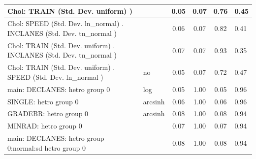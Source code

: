\begin{table}
\begin{center}
\begin{tabular}{|l|l|c|c|c|l|}
			\hline
			 Chol: TRAIN (Std. Dev. uniform) ) &  & 0.05 & 0.07 & 0.76 & 0.45 \\
			\hline
			 Chol: SPEED (Std. Dev. ln_normal) . INCLANES (Std. Dev.   tn_normal ) &  & 0.06 & 0.07 & 0.82 & 0.41 \\
			\hline
			 Chol: TRAIN (Std. Dev. uniform) . INCLANES (Std. Dev.   tn_normal ) &  & 0.07 & 0.07 & 0.93 & 0.35 \\
			\hline
			 Chol: TRAIN (Std. Dev. uniform) . SPEED (Std. Dev.   ln_normal ) & no & 0.05 & 0.07 & 0.72 & 0.47 \\
			\hline
			main: DECLANES: hetro group 0 & log & 0.05 & 1.00 & 0.05 & 0.96 \\
			\hline
			SINGLE: hetro group 0 & arcsinh & 0.06 & 1.00 & 0.06 & 0.96 \\
			\hline
			GRADEBR: hetro group 0 & arcsinh & 0.08 & 1.00 & 0.08 & 0.94 \\
			\hline
			MINRAD: hetro group 0 &  & 0.07 & 1.00 & 0.07 & 0.94 \\
			\hline
			main: DECLANES: hetro group 0:normal:sd  hetro group 0 &  & 0.08 & 1.00 & 0.08 & 0.94 \\
			\hline
		\end{tabular}
	\end{center}
\end{table}